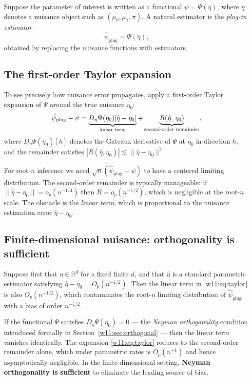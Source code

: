 \documentclass[master.tex]{subfiles}
\begin{document}
Suppose the parameter of interest is written as a functional
$\psi = \Psi(\eta)$, where $\eta$ denotes a nuisance object such
as $(\mu_0, \mu_1, \pi)$.  A natural estimator is the
\emph{plug-in estimator}
\[
  \hat\psi_{\mathrm{plug}} = \Psi(\hat\eta),
\]
obtained by replacing the nuisance functions with estimators.

\subsection{The first-order Taylor expansion}
\label{w11:subsec:taylor}

To see precisely how nuisance error propagates, apply a
first-order Taylor expansion of $\Psi$ around the true nuisance
$\eta_0$:
\begin{align}
  \hat\psi_{\mathrm{plug}} - \psi
  =
  \underbrace{%
    D_\eta\Psi(\eta_0)[\hat\eta - \eta_0]
  }_{\text{linear term}}
  +
  \underbrace{%
    R(\hat\eta,\,\eta_0)
  }_{\text{second-order remainder}},
  \label{w11:eq:taylor}
\end{align}
where $D_\eta\Psi(\eta_0)[h]$ denotes the Gateaux derivative of
$\Psi$ at $\eta_0$ in direction $h$, and the remainder satisfies
$|R(\hat\eta, \eta_0)| \lesssim \|\hat\eta - \eta_0\|^2$.

For root-$n$ inference we need $\sqrt{n}(\hat\psi_{\mathrm{plug}}
- \psi)$ to have a centered limiting distribution.  The
second-order remainder is typically manageable: if
$\|\hat\eta - \eta_0\| = o_p(n^{-1/4})$ then
$R = o_p(n^{-1/2})$, which is negligible at the root-$n$ scale.
The obstacle is the \emph{linear term}, which is proportional to
the nuisance estimation error $\hat\eta - \eta_0$.

\subsection{Finite-dimensional nuisance: orthogonality is sufficient}
\label{w11:subsec:finite-dim}

Suppose first that $\eta \in \mathbb{R}^d$ for a fixed finite $d$,
and that $\hat\eta$ is a standard parametric estimator satisfying
$\hat\eta - \eta_0 = O_p(n^{-1/2})$.  Then the linear term in
\eqref{w11:eq:taylor} is also $O_p(n^{-1/2})$, which contaminates
the root-$n$ limiting distribution of $\hat\psi_{\mathrm{plug}}$
with a bias of order $n^{-1/2}$.

If the functional $\Psi$ satisfies $D_\eta\Psi(\eta_0) = 0$ —
the \emph{Neyman orthogonality} condition introduced formally in
Section~\ref{w11:sec:orthogonal} — then the linear term vanishes
identically.  The expansion \eqref{w11:eq:taylor} reduces to the
second-order remainder alone, which under parametric rates is
$O_p(n^{-1})$ and hence asymptotically negligible.  In the
finite-dimensional setting, \textbf{Neyman orthogonality is
sufficient} to eliminate the leading source of bias.
\end{document}
